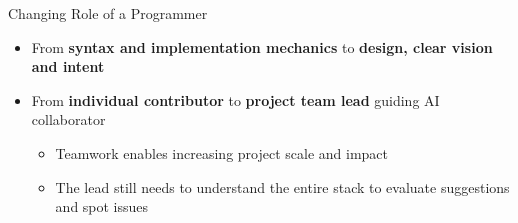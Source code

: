 \documentclass[xcolor=dvipsnames, aspectratio=169]{beamer}
\begin{document}
\begin{frame}{Changing Role of a Programmer}
  \begin{itemize}
    \item<1-> From \textbf{syntax and implementation mechanics} to \textbf{design, clear vision and intent}
    \item<2-> From \textbf{individual contributor} to \textbf{project team lead} guiding AI collaborator
    \begin{itemize}
      \item<2-> Teamwork enables increasing project scale and impact
      \item<2-> The lead still needs to understand the entire stack to evaluate suggestions and spot issues
    \end{itemize}
  \end{itemize}
  
  \vspace{1em}

  \begin{columns}
    \begin{column}{0.6\textwidth}
    \end{column}
    
    \begin{column}{0.4\textwidth}
    \end{column}
    

\end{columns}
\end{frame}
\end{document}
